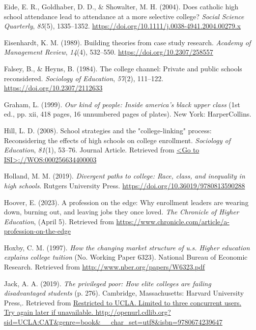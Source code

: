 \documentclass[
  12pt,
]{article}
\newlength{\cslhangindent}
\newlength{\cslentryspacingunit} %
\newenvironment{CSLReferences}[2] %
 {%
  \setlength{\parindent}{0pt}
  \ifodd #1
  \let\oldpar\par
  \def\par{\hangindent=\cslhangindent\oldpar}
  \fi
  \setlength{\parskip}{#2\cslentryspacingunit}
 }%
 {}
\begin{document}
\begin{CSLReferences}{1}{0}
\leavevmode{}%
Eide, E. R., Goldhaber, D. D., \& Showalter, M. H. (2004). Does catholic high school attendance lead to attendance at a more selective college? \emph{Social Science Quarterly}, \emph{85}(5), 1335--1352. \url{https://doi.org/10.1111/j.0038-4941.2004.00279.x}

\leavevmode{}%
Eisenhardt, K. M. (1989). Building theories from case study research. \emph{Academy of Management Review}, \emph{14}(4), 532--550. \url{https://doi.org/10.2307/258557}

\leavevmode{}%
Falsey, B., \& Heyns, B. (1984). The college channel: Private and public schools reconsidered. \emph{Sociology of Education}, \emph{57}(2), 111--122. \url{https://doi.org/10.2307/2112633}

\leavevmode{}%
Graham, L. (1999). \emph{Our kind of people: Inside america's black upper class} (1st ed., pp. xii, 418 pages, 16 unnumbered pages of plates). New York: HarperCollins.

\leavevmode{}%
Hill, L. D. (2008). School strategies and the "college-linking" process: Reconsidering the effects of high schools on college enrollment. \emph{Sociology of Education}, \emph{81}(1), 53--76. Journal Article. Retrieved from \href{\%3CGo\%20to\%20ISI\%3E://WOS:000256634400003}{\textless Go to ISI\textgreater://WOS:000256634400003}

\leavevmode{}%
Holland, M. M. (2019). \emph{Divergent paths to college: Race, class, and inequality in high schools}. Rutgers University Press. \url{https://doi.org/10.36019/9780813590288}

\leavevmode{}%
Hoover, E. (2023). A profession on the edge: Why enrollment leaders are wearing down, burning out, and leaving jobs they once loved. \emph{The Chronicle of Higher Education}, (April 5). Retrieved from \url{https://www.chronicle.com/article/a-profession-on-the-edge}

\leavevmode{}%
Hoxby, C. M. (1997). \emph{How the changing market structure of u.s. Higher education explains college tuition} (No. Working Paper 6323). National Bureau of Economic Research. Retrieved from \url{http://www.nber.org/papers/W6323.pdf}

\leavevmode{}%
Jack, A. A. (2019). \emph{The privileged poor: How elite colleges are failing disadvantaged students} (p. 276). Cambridge, Massachusetts: Harvard University Press,. Retrieved from \href{Restricted\%20to\%20UCLA.\%20Limited\%20to\%20three\%20concurrent\%20users.\%20Try\%20again\%20later\%20if\%20unavailable.\%20http://openurl.cdlib.org?sid=UCLA:CAT\&genre=book\&__char_set=utf8\&isbn=9780674239647}{Restricted to UCLA. Limited to three concurrent users. Try again later if unavailable. http://openurl.cdlib.org?sid=UCLA:CAT\&genre=book\&\_\_char\_set=utf8\&isbn=9780674239647}


\end{CSLReferences}
\end{document}
